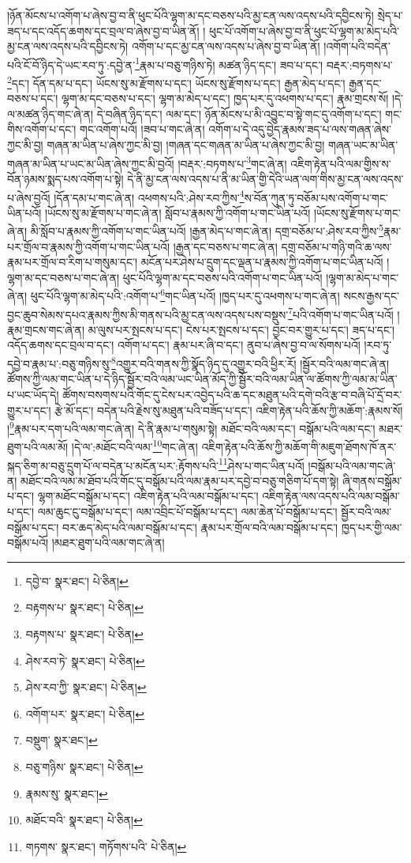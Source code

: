 །ཉོན་མོངས་པ་འགོག་པ་ཞེས་བྱ་བ་ནི་ཕུང་པོའི་ལྷག་མ་དང་བཅས་པའི་མྱ་ངན་ལས་འདས་པའི་དབྱིངས་ཏེ། སྲེད་པ་ཟད་པ་དང་འདོད་ཆགས་དང་བྲལ་བ་ཞེས་བྱ་བ་ཡིན་ནོ། །
ཕུང་པོ་འགོག་པ་ཞེས་བྱ་བ་ནི་ཕུང་པོ་ལྷག་མ་མེད་པའི་མྱ་ངན་ལས་འདས་པའི་དབྱིངས་ཏེ། འགོག་པ་དང་མྱ་ངན་ལས་འདས་པ་ཞེས་བྱ་བ་ཡིན་ནོ། །འགོག་པའི་བདེན་པའི་ངོ་བོ་ཉིད་དེ་ཡང་རབ་ཏུ་:དབྱེ་ན་\footnote{དབྱེ་བ་  སྣར་ཐང་།  པེ་ཅིན། }རྣམ་པ་བཅུ་གཉིས་ཏེ། མཚན་ཉིད་དང་། ཟབ་པ་དང་། བརྡར་:བཏགས་པ་\footnote{བརྟགས་པ་  སྣར་ཐང་།  པེ་ཅིན། }དང་། དོན་དམ་པ་དང་། ཡོངས་སུ་མ་རྫོགས་པ་དང་། ཡོངས་སུ་རྫོགས་པ་དང་། རྒྱན་མེད་པ་དང་། རྒྱན་དང་བཅས་པ་དང་། ལྷག་མ་དང་བཅས་པ་དང་། ལྷག་མ་མེད་པ་དང་། ཁྱད་པར་དུ་འཕགས་པ་དང་། རྣམ་གྲངས་སོ། །དེ་ལ་མཚན་ཉིད་གང་ཞེ་ན། དེ་བཞིན་ཉིད་དང་། ལམ་དང་། ཉོན་མོངས་པ་མི་འབྱུང་བ་སྟེ་གང་དུ་འགོག་པ་དང་། གང་གིས་འགོག་པ་དང་། གང་འགོག་པའོ། །ཟབ་པ་གང་ཞེ་ན། འགོག་པ་དེ་འདུ་བྱེད་རྣམས་ཟད་པ་ལས་གཞན་ཞེས་ཀྱང་མི་བྱ། གཞན་མ་ཡིན་པ་ཞེས་ཀྱང་མི་བྱ། །གཞན་དང་གཞན་མ་ཡིན་པ་ཞེས་ཀྱང་མི་བྱ། གཞན་ཡང་མ་ཡིན་གཞན་མ་ཡིན་པ་ཡང་མ་ཡིན་ཞེས་ཀྱང་མི་བྱའོ། །བརྡར་:བཏགས་པ་\footnote{བརྟགས་པ་  སྣར་ཐང་།  པེ་ཅིན། }གང་ཞེ་ན། འཇིག་རྟེན་པའི་ལམ་གྱིས་ས་བོན་ཉམས་སྨད་པས་འགོག་པ་སྟེ། དེ་ནི་མྱ་ངན་ལས་འདས་པ་ནི་མ་ཡིན་གྱི་དེའི་ཡན་ལག་གིས་མྱ་ངན་ལས་འདས་པ་ཞེས་བྱའོ། །དོན་དམ་པ་གང་ཞེ་ན། འཕགས་པའི་:ཤེས་རབ་ཀྱིས་\footnote{ཤེས་རབ་ཏེ་  སྣར་ཐང་།  པེ་ཅིན། }ས་བོན་ཀུན་ཏུ་བཅོམ་པས་འགོག་པ་གང་ཡིན་པའོ། །ཡོངས་སུ་མ་རྫོགས་པ་གང་ཞེ་ན། སློབ་པ་རྣམས་ཀྱི་འགོག་པ་གང་ཡིན་པའོ། །ཡོངས་སུ་རྫོགས་པ་གང་ཞེ་ན། མི་སློབ་པ་རྣམས་ཀྱི་འགོག་པ་གང་ཡིན་པའོ། །རྒྱན་མེད་པ་གང་ཞེ་ན། དགྲ་བཅོམ་པ་:ཤེས་རབ་ཀྱིས་\footnote{ཤེས་རབ་ཀྱི་  སྣར་ཐང་།  པེ་ཅིན། }རྣམ་པར་གྲོལ་བ་རྣམས་ཀྱི་འགོག་པ་གང་ཡིན་པའོ། །རྒྱན་དང་བཅས་པ་གང་ཞེ་ན། དགྲ་བཅོམ་པ་གཉི་གའི་ཆ་ལས་རྣམ་པར་གྲོལ་བ་རིག་པ་གསུམ་དང་། མངོན་པར་ཤེས་པ་དྲུག་དང་ལྡན་པ་རྣམས་ཀྱི་འགོག་པ་གང་ཡིན་པའོ། །ལྷག་མ་དང་བཅས་པ་གང་ཞེ་ན། ཕུང་པོའི་ལྷག་མ་དང་བཅས་པའི་འགོག་པ་གང་ཡིན་པའོ། །ལྷག་མ་མེད་པ་གང་ཞེ་ན། ཕུང་པོའི་ལྷག་མ་མེད་པའི་:འགོག་པ་\footnote{འགོག་པར་  སྣར་ཐང་།  པེ་ཅིན། }གང་ཡིན་པའོ། །ཁྱད་པར་དུ་འཕགས་པ་གང་ཞེ་ན། སངས་རྒྱས་དང་བྱང་ཆུབ་སེམས་དཔའ་རྣམས་ཀྱིས་མི་གནས་པའི་མྱ་ངན་ལས་འདས་པས་བསྡུས་\footnote{བསྡུག་  སྣར་ཐང་། }པའི་འགོག་པ་གང་ཡིན་པའོ། །རྣམ་གྲངས་གང་ཞེ་ན། མ་ལུས་པར་སྤངས་པ་དང་། ངེས་པར་སྤངས་པ་དང་། བྱང་བར་གྱུར་པ་དང་། ཟད་པ་དང་། འདོད་ཆགས་དང་བྲལ་བ་དང་། འགོག་པ་དང་། རྣམ་པར་ཞི་བ་དང་། ནུབ་པ་ཞེས་བྱ་བ་ལ་སོགས་པའོ། །རབ་ཏུ་དབྱེ་བ་རྣམ་པ་:བཅུ་གཉིས་སུ་\footnote{བཅུ་གཉིས་  སྣར་ཐང་།  པེ་ཅིན། }འགྱུར་བའི་གནས་ཀྱི་སྣོད་ཉིད་དུ་འགྱུར་བའི་ཕྱིར་རོ། །སྦྱོར་བའི་ལམ་གང་ཞེ་ན། ཚོགས་ཀྱི་ལམ་གང་ཡིན་པ་དེ་ཉིད་སྦྱོར་བའི་ལམ་ཡང་ཡིན་མོད་ཀྱི་སྦྱོར་བའི་ལམ་ཡིན་ལ་ཚོགས་ཀྱི་ལམ་མ་ཡིན་པ་ཡང་ཡོད་དེ། ཚོགས་བསགས་པའི་གོང་དུ་ངེས་པར་འབྱེད་པའི་ཆ་དང་མཐུན་པའི་དགེ་བའི་རྩ་བ་བཞི་པོ་དྲོ་བར་གྱུར་པ་དང་། རྩེ་མོ་དང་། བདེན་པའི་རྗེས་སུ་མཐུན་པའི་བཟོད་པ་དང་། འཇིག་རྟེན་པའི་ཆོས་ཀྱི་མཆོག་:རྣམས་སོ། །\footnote{རྣམས་སུ་  སྣར་ཐང་། }རྣམ་པར་དག་པའི་ལམ་གང་ཞེ་ན། དེ་ནི་རྣམ་པ་གསུམ་སྟེ། མཐོང་བའི་ལམ་དང་། བསྒོམ་པའི་ལམ་དང་། མཐར་ཐུག་པའི་ལམ་མོ། །དེ་ལ་:མཐོང་བའི་ལམ་\footnote{མཐོང་བའི་  སྣར་ཐང་།  པེ་ཅིན། }གང་ཞེ་ན། འཇིག་རྟེན་པའི་ཆོས་ཀྱི་མཆོག་གི་མཇུག་ཐོགས་ཁོ་ནར་སྐད་ཅིག་མ་བཅུ་དྲུག་པོ་ལ་བདེན་པ་མངོན་པར་:རྟོགས་པའི་\footnote{གཏགས་  སྣར་ཐང་། གཏོགས་པའི་  པེ་ཅིན། }ཤེས་པ་གང་ཡིན་པའོ། །བསྒོམ་པའི་ལམ་གང་ཞེ་ན། མཐོང་བའི་ལམ་མ་ཐོབ་པའི་གོང་དུ་བསྒོམ་པའི་ལམ་རྣམ་པར་དབྱེ་བ་བཅུ་གཅིག་པོ་དག་སྟེ། ཞི་གནས་བསྒོམ་པ་དང་། ལྷག་མཐོང་བསྒོམ་པ་དང་། འཇིག་རྟེན་པའི་ལམ་བསྒོམ་པ་དང་། འཇིག་རྟེན་ལས་འདས་པའི་ལམ་བསྒོམ་པ་དང་། ལམ་ཆུང་ངུ་བསྒོམ་པ་དང་། ལམ་འབྲིང་པོ་བསྒོམ་པ་དང་། ལམ་ཆེན་པོ་བསྒོམ་པ་དང་། སྦྱོར་བའི་ལམ་བསྒོམ་པ་དང་། བར་ཆད་མེད་པའི་ལམ་བསྒོམ་པ་དང་། རྣམ་པར་གྲོལ་བའི་ལམ་བསྒོམ་པ་དང་། ཁྱད་པར་གྱི་ལམ་བསྒོམ་པའོ། །མཐར་ཐུག་པའི་ལམ་གང་ཞེ་ན། 